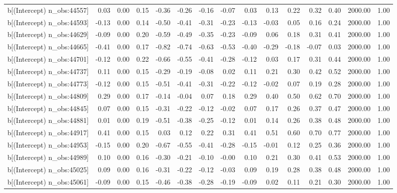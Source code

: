 \begin{table}[ht]
\begin{tabular}{rrrrrrrrrrrrrrr}
  b[(Intercept) n\_obs:44557] & 0.03 & 0.00 & 0.15 & -0.36 & -0.26 & -0.16 & -0.07 & 0.03 & 0.13 & 0.22 & 0.32 & 0.40 & 2000.00 & 1.00 \\ 
  b[(Intercept) n\_obs:44593] & -0.13 & 0.00 & 0.14 & -0.50 & -0.41 & -0.31 & -0.23 & -0.13 & -0.03 & 0.05 & 0.16 & 0.24 & 2000.00 & 1.00 \\ 
  b[(Intercept) n\_obs:44629] & -0.09 & 0.00 & 0.20 & -0.59 & -0.49 & -0.35 & -0.23 & -0.09 & 0.06 & 0.18 & 0.31 & 0.41 & 2000.00 & 1.00 \\ 
  b[(Intercept) n\_obs:44665] & -0.41 & 0.00 & 0.17 & -0.82 & -0.74 & -0.63 & -0.53 & -0.40 & -0.29 & -0.18 & -0.07 & 0.03 & 2000.00 & 1.00 \\ 
  b[(Intercept) n\_obs:44701] & -0.12 & 0.00 & 0.22 & -0.66 & -0.55 & -0.41 & -0.28 & -0.12 & 0.03 & 0.17 & 0.31 & 0.44 & 2000.00 & 1.00 \\ 
  b[(Intercept) n\_obs:44737] & 0.11 & 0.00 & 0.15 & -0.29 & -0.19 & -0.08 & 0.02 & 0.11 & 0.21 & 0.30 & 0.42 & 0.52 & 2000.00 & 1.00 \\ 
  b[(Intercept) n\_obs:44773] & -0.12 & 0.00 & 0.15 & -0.51 & -0.41 & -0.31 & -0.22 & -0.12 & -0.02 & 0.07 & 0.19 & 0.28 & 2000.00 & 1.00 \\ 
  b[(Intercept) n\_obs:44809] & 0.29 & 0.00 & 0.17 & -0.14 & -0.04 & 0.07 & 0.18 & 0.29 & 0.40 & 0.50 & 0.62 & 0.70 & 2000.00 & 1.00 \\ 
  b[(Intercept) n\_obs:44845] & 0.07 & 0.00 & 0.15 & -0.31 & -0.22 & -0.12 & -0.02 & 0.07 & 0.17 & 0.26 & 0.37 & 0.47 & 2000.00 & 1.00 \\ 
  b[(Intercept) n\_obs:44881] & 0.01 & 0.00 & 0.19 & -0.51 & -0.38 & -0.25 & -0.12 & 0.01 & 0.14 & 0.26 & 0.38 & 0.48 & 2000.00 & 1.00 \\ 
  b[(Intercept) n\_obs:44917] & 0.41 & 0.00 & 0.15 & 0.03 & 0.12 & 0.22 & 0.31 & 0.41 & 0.51 & 0.60 & 0.70 & 0.77 & 2000.00 & 1.00 \\ 
  b[(Intercept) n\_obs:44953] & -0.15 & 0.00 & 0.20 & -0.67 & -0.55 & -0.41 & -0.28 & -0.15 & -0.01 & 0.12 & 0.25 & 0.36 & 2000.00 & 1.00 \\ 
  b[(Intercept) n\_obs:44989] & 0.10 & 0.00 & 0.16 & -0.30 & -0.21 & -0.10 & -0.00 & 0.10 & 0.21 & 0.30 & 0.41 & 0.53 & 2000.00 & 1.00 \\ 
  b[(Intercept) n\_obs:45025] & 0.09 & 0.00 & 0.16 & -0.31 & -0.22 & -0.12 & -0.03 & 0.09 & 0.19 & 0.28 & 0.38 & 0.48 & 2000.00 & 1.00 \\ 
  b[(Intercept) n\_obs:45061] & -0.09 & 0.00 & 0.15 & -0.46 & -0.38 & -0.28 & -0.19 & -0.09 & 0.02 & 0.11 & 0.21 & 0.30 & 2000.00 & 1.00 \\ 

\end{tabular}
\end{table}
